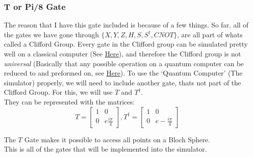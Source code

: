 \documentclass{report}
\begin{document}
\subsubsection{T or Pi/8 Gate}

The reason that I have this gate included is because of a few things. So
far, all of the gates we have gone through
\(\{ X,Y,Z,H,S,S^\dagger, CNOT \}\), are all part of whats called a
Clifford Group. Every gate in the Clifford group can be simulated pretty
well on a classical computer (See
\href{https://en.wikipedia.org/wiki/Gottesman\%E2\%80\%93Knill_theorem}{Here}),
and therefore the Clifford group is not \emph{universal} (Basically that
any possible operation on a quantum computer can be reduced to and
preformed on, see
\href{https://en.wikipedia.org/wiki/Quantum_gate\#Universal_quantum_gates}{Here}).
To use the `Quantum Computer' (The simulator) properly, we will need to
include another gate, thats not part of the Clifford Group. For this, we
will use \(T\) and \(T^\dagger\).\\
They can be represented with the matrices:\\
\[
T = \left[ \begin{matrix} 1 & 0\\0 & e\frac{i\pi}{4}\end{matrix} \right], T^\dagger = \left[ \begin{matrix} 1 & 0\\0 & e-\frac{i\pi}{4}\end{matrix} \right]\]

The \(T\) Gate makes it possible to access all points on a Bloch
Sphere.\\
This is all of the gates that will be implemented into the simulator.
\end{document}
